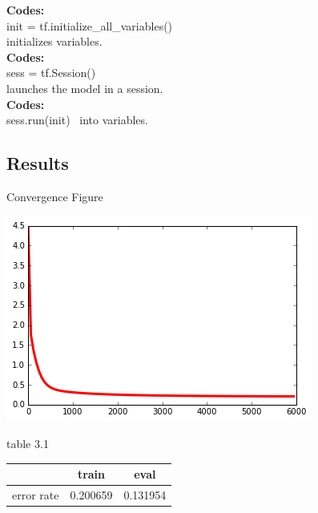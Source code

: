 \documentclass{article}
\begin{document}
\textbf{Codes:}
\\init = tf.initialize\_all\_variables() 
\\initializes variables.
\\\textbf{Codes:}
\\sess = tf.Session() 
\\launches the model in a session.
\\\textbf{Codes:}
\\sess.run(init)  
\ into variables.

\subsection{Results}
Convergence Figure

\includegraphics[width = .8\textwidth]{tensor.png}

\rule{0pt}{0pt} 

table 3.1

\begin{tabular}{ccc}
\hline
 & train& eval\\
\hline
error rate& 0.200659& 0.131954\\
\hline
\end{tabular}
\end{document}
